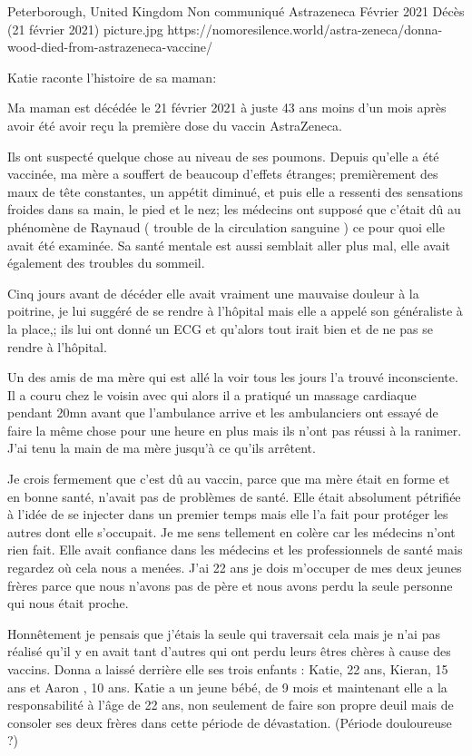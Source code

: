 {Peterborough, United Kingdom}
{Non communiqué}
{Astrazeneca}
{Février 2021}
{Décès (21 février 2021)}
{picture.jpg}
{https://nomoresilence.world/astra-zeneca/donna-wood-died-from-astrazeneca-vaccine/}
{

Katie raconte l’histoire de sa maman:
  
Ma maman est décédée le 21 février 2021 à juste 43 ans moins d’un mois après
avoir été avoir reçu la première dose du vaccin AstraZeneca.

Ils ont suspecté quelque chose au niveau de ses poumons. Depuis qu’elle a été
vaccinée, ma mère a souffert de beaucoup d’effets étranges; premièrement des
maux de tête constantes, un appétit diminué, et puis elle a ressenti des
sensations froides dans sa main, le pied et le nez; les médecins ont supposé que
c’était dû au phénomène de Raynaud ( trouble de la circulation sanguine ) ce
pour quoi elle avait été examinée. Sa santé mentale est aussi semblait aller
plus mal, elle avait également des troubles du sommeil.

Cinq jours avant de décéder elle avait vraiment une mauvaise douleur à la
poitrine, je lui suggéré de se rendre à l’hôpital mais elle a appelé son
généraliste à la place,; ils lui ont donné un ECG et qu’alors tout irait bien et
de ne pas se rendre à l’hôpital.

Un des amis de ma mère qui est allé la voir tous les jours l’a trouvé
inconsciente. Il a couru chez le voisin avec qui alors il a pratiqué un massage
cardiaque pendant 20mn avant que l’ambulance arrive et les ambulanciers ont
essayé de faire la même chose pour une heure en plus mais ils n’ont pas réussi à
la ranimer. J’ai tenu la main de ma mère jusqu’à ce qu’ils arrêtent.

Je crois fermement que c’est dû au vaccin, parce que ma mère était en forme et
en bonne santé, n’avait pas de problèmes de santé. Elle était absolument
pétrifiée à l’idée de se injecter dans un premier temps mais elle l’a fait pour
protéger les autres dont elle s’occupait. Je me sens tellement en colère car les
médecins n’ont rien fait. Elle avait confiance dans les médecins et les
professionnels de santé mais regardez où cela nous a menées. J’ai 22 ans je dois
m’occuper de mes deux jeunes frères parce que nous n’avons pas de père et nous
avons perdu la seule personne qui nous était proche.

Honnêtement je pensais que j’étais la seule qui traversait cela mais je n’ai pas
réalisé qu’il y en avait tant d’autres qui ont perdu leurs êtres chères à cause
des vaccins. Donna a laissé derrière elle ses trois enfants : Katie, 22 ans,
Kieran, 15 ans et Aaron , 10 ans. Katie a un jeune bébé, de 9 mois et maintenant
elle a la responsabilité à l’âge de 22 ans, non seulement de faire son propre
deuil mais de consoler ses deux frères dans cette période de
dévastation. (Période douloureuse ?)

}
